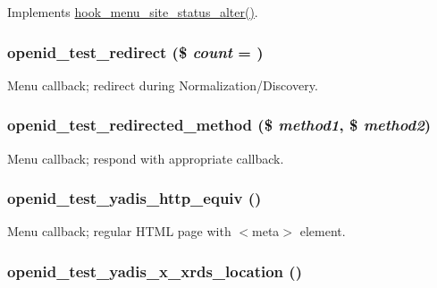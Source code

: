 \label{openid__test_8module_ada79e0478bbc38e21a7bb7981e9797ee}
Implements \hyperlink{group__hooks_ga3096be11aad61c8b342ade94789f6137}{hook\_\-menu\_\-site\_\-status\_\-alter()}. \hypertarget{openid__test_8module_a4e8a0f0bc8c31c066ae66b927521775a}{
\subsubsection[{openid\_\-test\_\-redirect}]{\setlength{\rightskip}{0pt plus 5cm}openid\_\-test\_\-redirect (\$ {\em count} = {})}}
\label{openid__test_8module_a4e8a0f0bc8c31c066ae66b927521775a}
Menu callback; redirect during Normalization/Discovery. \hypertarget{openid__test_8module_a3667e639dafbeed1e4ebf721bf992716}{
\subsubsection[{openid\_\-test\_\-redirected\_\-method}]{\setlength{\rightskip}{0pt plus 5cm}openid\_\-test\_\-redirected\_\-method (\$ {\em method1}, \/  \$ {\em method2})}}
\label{openid__test_8module_a3667e639dafbeed1e4ebf721bf992716}
Menu callback; respond with appropriate callback. \hypertarget{openid__test_8module_a76e741fd2ce4dadb8644d3617066095d}{
\subsubsection[{openid\_\-test\_\-yadis\_\-http\_\-equiv}]{\setlength{\rightskip}{0pt plus 5cm}openid\_\-test\_\-yadis\_\-http\_\-equiv ()}}
\label{openid__test_8module_a76e741fd2ce4dadb8644d3617066095d}
Menu callback; regular HTML page with $<$meta$>$ element. \hypertarget{openid__test_8module_a9159017197fedc11b3676d8fbd9c6d8d}{
\subsubsection[{openid\_\-test\_\-yadis\_\-x\_\-xrds\_\-location}]{\setlength{\rightskip}{0pt plus 5cm}openid\_\-test\_\-yadis\_\-x\_\-xrds\_\-location ()}}
